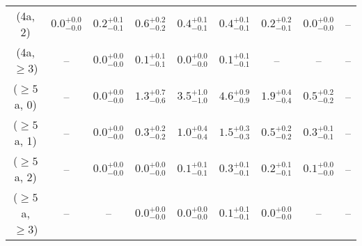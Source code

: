 \begin{table}[h!]
{\begin{tabular}{ccccccccc}
	(4a, 2) & $0.0^{+ 0.0 }_{- 0.0 }$ & $0.2^{+ 0.1 }_{- 0.1 }$ & $0.6^{+ 0.2 }_{- 0.2 }$ & $0.4^{+ 0.1 }_{- 0.1 }$ & $0.4^{+ 0.1 }_{- 0.1 }$ & $0.2^{+ 0.2 }_{- 0.1 }$ & $0.0^{+ 0.0 }_{- 0.0 }$ & -- \\[0.5ex] 
	(4a, $\ge3$) & -- & $0.0^{+ 0.0 }_{- 0.0 }$ & $0.1^{+ 0.1 }_{- 0.1 }$ & $0.0^{+ 0.0 }_{- 0.0 }$ & $0.1^{+ 0.1 }_{- 0.1 }$ & -- & -- & -- \\[0.5ex] 
	($\ge5$a, 0) & -- & $0.0^{+ 0.0 }_{- 0.0 }$ & $1.3^{+ 0.7 }_{- 0.6 }$ & $3.5^{+ 1.0 }_{- 1.0 }$ & $4.6^{+ 0.9 }_{- 0.9 }$ & $1.9^{+ 0.4 }_{- 0.4 }$ & $0.5^{+ 0.2 }_{- 0.2 }$ & -- \\[0.5ex] 
	($\ge5$a, 1) & -- & $0.0^{+ 0.0 }_{- 0.0 }$ & $0.3^{+ 0.2 }_{- 0.2 }$ & $1.0^{+ 0.4 }_{- 0.4 }$ & $1.5^{+ 0.3 }_{- 0.3 }$ & $0.5^{+ 0.2 }_{- 0.2 }$ & $0.3^{+ 0.1 }_{- 0.1 }$ & -- \\[0.5ex] 
	($\ge5$a, 2) & -- & $0.0^{+ 0.0 }_{- 0.0 }$ & $0.0^{+ 0.0 }_{- 0.0 }$ & $0.1^{+ 0.1 }_{- 0.1 }$ & $0.3^{+ 0.1 }_{- 0.1 }$ & $0.2^{+ 0.1 }_{- 0.1 }$ & $0.1^{+ 0.0 }_{- 0.0 }$ & -- \\[0.5ex] 
	($\ge5$a, $\ge3$) & -- & -- & $0.0^{+ 0.0 }_{- 0.0 }$ & $0.0^{+ 0.0 }_{- 0.0 }$ & $0.1^{+ 0.1 }_{- 0.1 }$ & $0.0^{+ 0.0 }_{- 0.0 }$ & -- & -- \\[0.5ex] 
	\hline
	\hline
\end{tabular}}
\end{table}
